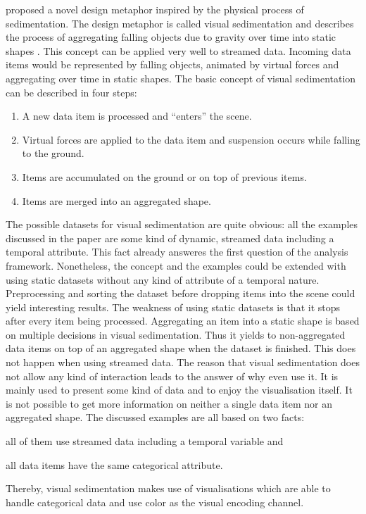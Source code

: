 \citeauthor{Huron2013} proposed a novel design metaphor inspired by the physical process of sedimentation. The design metaphor is called visual sedimentation and describes the process of aggregating falling objects due to gravity over time into static shapes . This concept can be applied very well to streamed data. Incoming data items would be represented by falling objects, animated by virtual forces and aggregating over time in static shapes.
The basic concept of visual sedimentation can be described in four steps:

\begin{enumerate}
\item A new data item is processed and ``enters'' the scene.
\item Virtual forces are applied to the data item and suspension occurs while falling to the ground.
\item Items are accumulated on the ground or on top of previous items.
\item Items are merged into an aggregated shape.
\end{enumerate}

The possible datasets for visual sedimentation are quite obvious: all the examples discussed in the paper are some kind of dynamic, streamed data including a temporal attribute. This fact already answeres the first question of the analysis framework. Nonetheless, the concept and the examples could be extended with using static datasets without any kind of attribute of a temporal nature. Preprocessing and sorting the dataset before dropping items into the scene could yield interesting results. The weakness of using static datasets is that it stops after every item being processed. Aggregating an item into a static shape is based on multiple decisions in visual sedimentation. Thus it yields to non-aggregated data items on top of an aggregated shape when the dataset is finished. This does not happen when using streamed data.
The reason that visual sedimentation does not allow any kind of interaction leads to the answer of why even use it. It is mainly used to present some kind of data and to enjoy the visualisation itself. It is not possible to get more information on neither a single data item nor an aggregated shape.
The discussed examples are all based on two facts:
\begin{enumerate*}[label={(\arabic*)}]
\item all of them use streamed data including a temporal variable and
\item all data items have the same categorical attribute.
\end{enumerate*}
Thereby, visual sedimentation makes use of visualisations which are able to handle categorical data and use color as the visual encoding channel.

